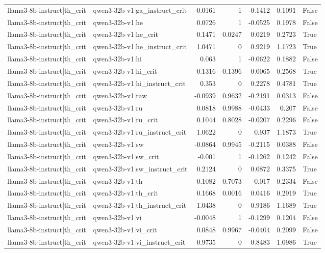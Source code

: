 \begin{table}
\begin{tabular}{l l r r r r l}
llama3-8b-instruct|th_crit & qwen3-32b-v1|ga_instruct_crit & -0.0161 & 1 & -0.1412 & 0.1091 & False \\
llama3-8b-instruct|th_crit & qwen3-32b-v1|he & 0.0726 & 1 & -0.0525 & 0.1978 & False \\
llama3-8b-instruct|th_crit & qwen3-32b-v1|he_crit & 0.1471 & 0.0247 & 0.0219 & 0.2723 & True \\
llama3-8b-instruct|th_crit & qwen3-32b-v1|he_instruct_crit & 1.0471 & 0 & 0.9219 & 1.1723 & True \\
llama3-8b-instruct|th_crit & qwen3-32b-v1|hi & 0.063 & 1 & -0.0622 & 0.1882 & False \\
llama3-8b-instruct|th_crit & qwen3-32b-v1|hi_crit & 0.1316 & 0.1396 & 0.0065 & 0.2568 & True \\
llama3-8b-instruct|th_crit & qwen3-32b-v1|hi_instruct_crit & 0.353 & 0 & 0.2278 & 0.4781 & True \\
llama3-8b-instruct|th_crit & qwen3-32b-v1|raw & -0.0939 & 0.9632 & -0.2191 & 0.0313 & False \\
llama3-8b-instruct|th_crit & qwen3-32b-v1|ru & 0.0818 & 0.9988 & -0.0433 & 0.207 & False \\
llama3-8b-instruct|th_crit & qwen3-32b-v1|ru_crit & 0.1044 & 0.8028 & -0.0207 & 0.2296 & False \\
llama3-8b-instruct|th_crit & qwen3-32b-v1|ru_instruct_crit & 1.0622 & 0 & 0.937 & 1.1873 & True \\
llama3-8b-instruct|th_crit & qwen3-32b-v1|sw & -0.0864 & 0.9945 & -0.2115 & 0.0388 & False \\
llama3-8b-instruct|th_crit & qwen3-32b-v1|sw_crit & -0.001 & 1 & -0.1262 & 0.1242 & False \\
llama3-8b-instruct|th_crit & qwen3-32b-v1|sw_instruct_crit & 0.2124 & 0 & 0.0872 & 0.3375 & True \\
llama3-8b-instruct|th_crit & qwen3-32b-v1|th & 0.1082 & 0.7073 & -0.017 & 0.2334 & False \\
llama3-8b-instruct|th_crit & qwen3-32b-v1|th_crit & 0.1668 & 0.0016 & 0.0416 & 0.2919 & True \\
llama3-8b-instruct|th_crit & qwen3-32b-v1|th_instruct_crit & 1.0438 & 0 & 0.9186 & 1.1689 & True \\
llama3-8b-instruct|th_crit & qwen3-32b-v1|vi & -0.0048 & 1 & -0.1299 & 0.1204 & False \\
llama3-8b-instruct|th_crit & qwen3-32b-v1|vi_crit & 0.0848 & 0.9967 & -0.0404 & 0.2099 & False \\
llama3-8b-instruct|th_crit & qwen3-32b-v1|vi_instruct_crit & 0.9735 & 0 & 0.8483 & 1.0986 & True \\

\end{tabular}
\end{table}
